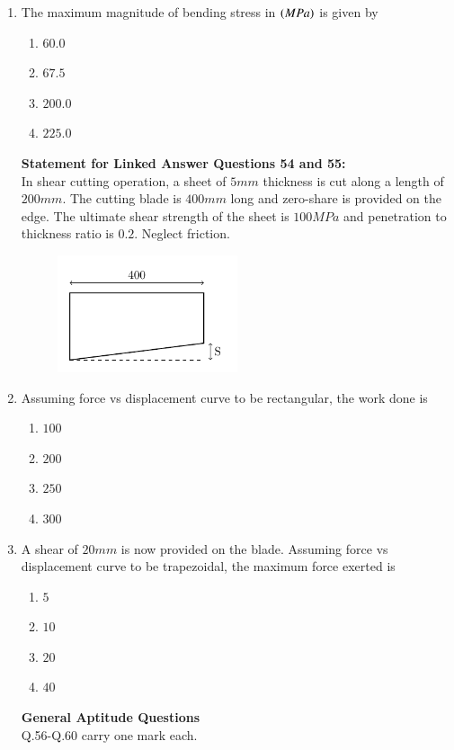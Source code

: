 \documentclass[journal]{IEEEtran}
\begin{document}
\begin{enumerate}
    \item The maximum magnitude of bending stress in $\left(MPa\right)$ is given by 
    \begin{enumerate}
    \item $60.0$
    \item $67.5$
    \item $200.0$
    \item $225.0$
    \end{enumerate}
    \textbf{Statement for Linked Answer Questions 54 and 55:}\\

In shear cutting operation, a sheet of $5mm$ thickness is cut along a length of $200mm$. The cutting blade is $400 mm$ long  and zero-share  is provided on the edge. The ultimate shear strength of the sheet is $100 MPa$ and penetration to thickness ratio is $0.2$. Neglect friction.
\begin{figure}[h]  %
    \centering
    \includegraphics[width=0.5\textwidth]{tikz_image.pdf}  %
\end{figure}
    \item Assuming force vs displacement curve to be rectangular, the work done  is
    \begin{enumerate}
        \item $100$
        \item $200$
        \item $250$
        \item $300$
    \end{enumerate}
    \item A shear of $20 mm$  is now provided on the blade. Assuming force vs displacement curve to be trapezoidal, the maximum force  exerted is
    \begin{enumerate}
        \item $5$
        \item $10$
        \item $20$
        \item $40$
    \end{enumerate}
    \textbf{General Aptitude  Questions}\\
    Q.56-Q.60 carry one mark each.\\


\end{enumerate}
\end{document}
